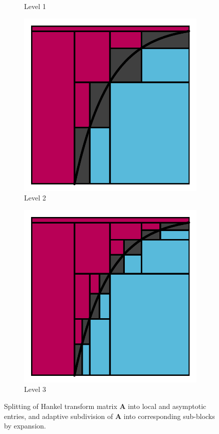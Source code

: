 \begin{figure}
\begin{subfigure}[b]{0.23\textwidth}
    \caption{Level 1}
  \end{subfigure}
  \hfill
  \begin{subfigure}[b]{0.23\textwidth}
    \includegraphics[width=\textwidth, trim={\tw, \tw, \tw, \tw}, clip]{./figures/splitting_lvl2.pdf}
    \caption{Level 2}
  \end{subfigure}
  \hfill
  \begin{subfigure}[b]{0.23\textwidth}
    \includegraphics[width=\textwidth, trim={\tw, \tw, \tw, \tw}, clip]{./figures/splitting_lvl3.pdf}
    \caption{Level 3}
  \end{subfigure}
  \caption{Splitting of Hankel transform matrix $\bm{A}$ into local and asymptotic entries, and adaptive subdivision of $\bm{A}$ into corresponding sub-blocks by expansion.}
\end{figure}